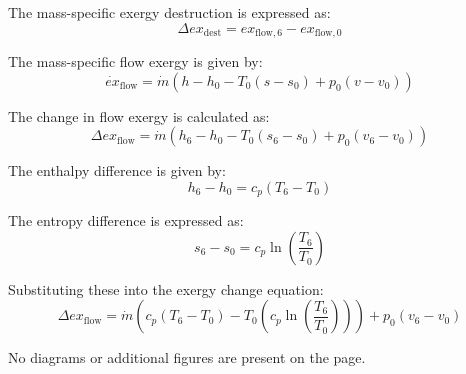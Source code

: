 The mass-specific exergy destruction is expressed as:  
\[
\Delta ex_{\text{dest}} = ex_{\text{flow},6} - ex_{\text{flow},0}
\]  

The mass-specific flow exergy is given by:  
\[
\dot{ex}_{\text{flow}} = \dot{m} \left( h - h_0 - T_0 (s - s_0) + p_0 (v - v_0) \right)
\]  

The change in flow exergy is calculated as:  
\[
\Delta ex_{\text{flow}} = \dot{m} \left( h_6 - h_0 - T_0 (s_6 - s_0) + p_0 (v_6 - v_0) \right)
\]  

The enthalpy difference is given by:  
\[
h_6 - h_0 = c_p (T_6 - T_0)
\]  

The entropy difference is expressed as:  
\[
s_6 - s_0 = c_p \ln \left( \frac{T_6}{T_0} \right)
\]  

Substituting these into the exergy change equation:  
\[
\Delta ex_{\text{flow}} = \dot{m} \left( c_p (T_6 - T_0) - T_0 \left( c_p \ln \left( \frac{T_6}{T_0} \right) \right) \right) + p_0 (v_6 - v_0)
\]  

No diagrams or additional figures are present on the page.